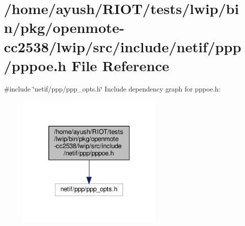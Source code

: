 \hypertarget{openmote-cc2538_2lwip_2src_2include_2netif_2ppp_2pppoe_8h}{}\section{/home/ayush/\+R\+I\+O\+T/tests/lwip/bin/pkg/openmote-\/cc2538/lwip/src/include/netif/ppp/pppoe.h File Reference}
\label{openmote-cc2538_2lwip_2src_2include_2netif_2ppp_2pppoe_8h}
{\ttfamily \#include \char`\"{}netif/ppp/ppp\+\_\+opts.\+h\char`\"{}}\newline
Include dependency graph for pppoe.\+h\+:
\nopagebreak
\begin{figure}[H]
\begin{center}
\leavevmode
\includegraphics[width=205pt]{openmote-cc2538_2lwip_2src_2include_2netif_2ppp_2pppoe_8h__incl}
\end{center}
\end{figure}
